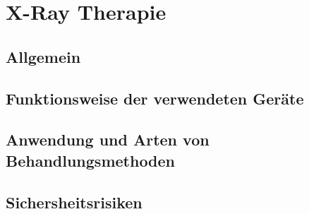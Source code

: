 \section{X-Ray Therapie}

\subsection{Allgemein}


\subsection{Funktionsweise der verwendeten Geräte}

\subsection{Anwendung und Arten von Behandlungsmethoden}

\subsection{Sichersheitsrisiken}

